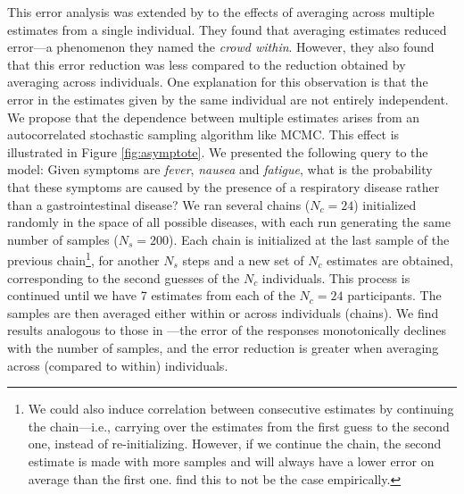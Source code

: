 This error analysis was extended by \cite{vul08} to the effects of averaging across multiple estimates from a single individual. They found that averaging estimates reduced error---a phenomenon they named the \emph{crowd within}. However, they also found that this error reduction was less compared to the reduction obtained by averaging across individuals. One explanation for this observation is that the error in the estimates given by the same individual are not entirely independent. We propose that the dependence between multiple estimates arises from an autocorrelated stochastic sampling algorithm like MCMC. 
This effect is illustrated in Figure \ref{fig:asymptote}. We presented the following query to the model: Given symptoms are \emph{fever}, \emph{nausea} and \emph{fatigue}, what is the probability that these symptoms are caused by the presence of a respiratory disease rather than a gastrointestinal disease? We ran several chains ($N_c = 24$) initialized randomly in the space of all possible diseases, with each run generating the same number of samples ($N_s = 200$). Each chain is initialized at the last sample of the previous chain\footnote{We could also induce correlation between consecutive estimates by continuing the chain---i.e., carrying over the estimates from the first guess to the second one, instead of re-initializing. However, if we continue the chain, the second estimate is made with more samples and will always have a lower error on average than the first one. \cite{vul08} find this to not be the case empirically.}, for another $N_s$ steps and a new set of $N_c$ estimates are obtained, corresponding to the second guesses of the $N_c$ individuals. This process is continued until we have 7 estimates from each of the $N_c = 24$ participants. The samples are then averaged either within or across individuals (chains). We find results analogous to those in \cite{vul08}---the error of the responses monotonically declines with the number of samples, and the error reduction is greater when averaging across (compared to within) individuals.

